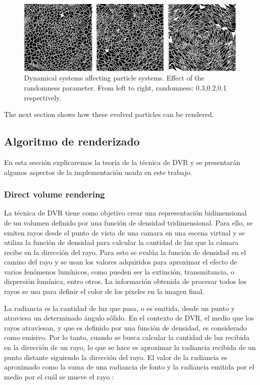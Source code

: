 \documentclass[oneside,a4paper,english,links]{amca}
\begin{document}
\begin{figure}[htb!]
  \centerline{\includegraphics[scale=0.21]{fig4}}
  \caption{Dynamical systems affecting particle systems. Effect of the randomness parameter. From left to right, randomness: 0.3,0.2,0.1 respectively. }
  \label{fg:fig4}
\end{figure}

The next section shows how these evolved particles can be rendered.

\subsection{Algoritmo de renderizado}

En esta sección explicaremos la teoría de la técnica de DVR y se
presentarán algunos aspectos de la implementación usada en este
trabajo.

\subsubsection{Direct volume rendering}

La técnica de DVR tiene como objetivo crear una representación
bidimensional de un volumen definido por una función de densidad
tridimensional. Para ello, se emiten rayos desde el punto de vista de
una camara en una escena virtual y se utiliza la función de densidad
para calcular la cantidad de luz que la cámara recibe en la dirección
del rayo. Para esto se evalúa la función de densidad en el camino del
rayo y se usan los valores adquiridos para aproximar el efecto de
varios fenómenos lumínicos, como pueden ser la extinción,
transmitancia, o dispersión lumínica, entro otros. La información
obtenida de procesar todos los rayos se usa para definir el color de
los pixeles en la imagen final.

La radiancia es la cantidad de luz que pasa, o es emitida, desde un
punto y atraviesa un determinado ángulo sólido. En el contexto de DVR,
el medio que los rayos atraviesan, y que es definido por una función
de densidad, es considerado como emisivo. Por lo tanto, cuando se
busca calcular la cantidad de luz recibida en la dirección de un rayo,
lo que se hace es aproximar la radiancia recibida de un punto distante
siguiendo la dirección del rayo. El valor de la radiancia es
aproximado como la suma de una radiancia de fonto y la radiancia
emitida por el medio por el cuál se mueve el rayo \citep{Kratz2006} :
\end{document}
